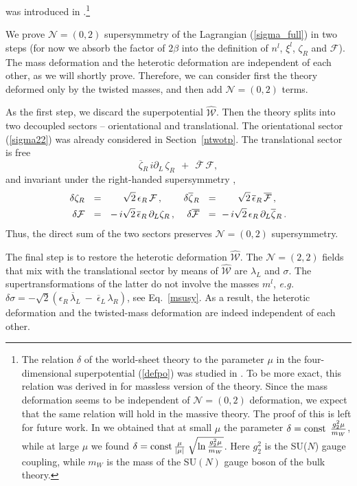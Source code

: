 \documentclass[12pt]{article}
\newcommand{\ntwot}{${\mathcal N}= \left(2,2\right) $ }
\newcommand{\ntwoo}{${\mathcal N}= \left(0,2\right) $ }
\newcommand{\p}{\partial}
\newcommand{\ov}{\overline}
\newcommand{\mc}[1]{\mathcal{#1}}
\newcommand{\bzr}{\ov{\zeta}{}_R}
\newcommand{\zr}{\zeta_R}
\newcommand{\lar}{\lambda_R}
\newcommand{\blal}{\ov{\lambda}{}_L}
\newcommand{\ff}{\mc{F}}
\newcommand{\bff}{\ov{\mc{F}}}
\newcommand{\eer}{\epsilon_R}
\newcommand{\beer}{\ov{\epsilon}{}_R}
\newcommand{\beel}{\ov{\epsilon}{}_L}
\begin{document}
was introduced in \cite{SYhet}.\footnote{The relation  $\delta$ of the
world-sheet theory to the  parameter $\mu$
in the four-dimensional  superpotential (\ref{defpo}) was studied in
\cite{SYhet,BSYhet}. To be more exact, this 
relation was derived in \cite{SYhet,BSYhet} for massless
version of the theory. Since 
the mass deformation seems to be  independent of \ntwoo deformation,
 we expect that the same 
relation will hold in the massive theory. The proof of this is
left for  future work. In \cite{SYhet,BSYhet} we obtained that at small $\mu$ the parameter
$
\delta =
 {\rm const}\;\,\frac{g_2^2\mu}{m_W}$,
 while at large $\mu$ we found $\delta =
 {\rm const}\,\frac{\mu}{|\mu|}\;
 \sqrt{\ln{\frac{g^2_2\mu}{m_W}}}$.
 Here $g_2^2$ is the SU($N$) gauge coupling, 
while $m_W$ is the mass of the SU$(N)$ gauge boson of the bulk theory.} 


        We prove \ntwoo supersymmetry of the Lagrangian 
        (\ref{sigma_full}) in two steps
	(for now we absorb the factor of $ 2\beta $ into the definition of $ n^l $, $ \xi^l $,
        $ \zeta_R $ and $ \mc{F} $).
        The mass  deformation and the heterotic deformation are independent of each other, as we will shortly prove.
Therefore,   we can consider  first the theory deformed only by the
twisted masses, and then add \ntwoo terms.

As the first step, we discard the superpotential $ \hat{\mc{W}} $.
        Then the theory splits into two decoupled sectors -- orientational and translational. 
        The orientational sector (\ref{sigma22}) was 
        already considered in Section~\ref{ntwotp}.
  The translational sector is free
\[
	\bzr\, i\p_L\, \zr ~~+~~ \bff\,\ff ,
\]
	and invariant under the right-handed supersymmetry \cite{SYhet},
\begin{align}
%
\notag
        \delta \zr & ~~=~~ ~~~~ \sqrt{2}\, \eer\, \ff\,,
        &
        \delta \bzr & ~~=~~ ~~~~ \sqrt{2}\, \beer\, \bff\,,
        \\
%
\label{tsusy}
        \delta \ff & ~~=~~ -\, i\sqrt{2}\, \beer\, \p_L \zr\,,
        &
        \delta \bff & ~~=~ -\, i\sqrt{2}\, \eer\, \p_L \bzr
        \,.
\end{align}
	Thus, the direct sum of the two sectors preserves \ntwoo supersymmetry.
	
	The final step is to restore the heterotic deformation $ \hat{\mc{W}} $. 
	The \ntwot fields that mix with the translational sector by means
	of $ \hat{\mc{W}} $ are $ \lambda_L $ and $ \sigma $.
	The supertransformations of the latter do not involve the masses $ m^l $, 
	{\it e.g.} $ \delta\sigma = -\sqrt{2}
                              \left( \eer\, \blal ~-~ \beel\,\lar \right)$, 
                              see Eq.~\eqref{msusy}.
As a result,  the heterotic deformation and the twisted-mass deformation are indeed independent
of each other.
\end{document}
